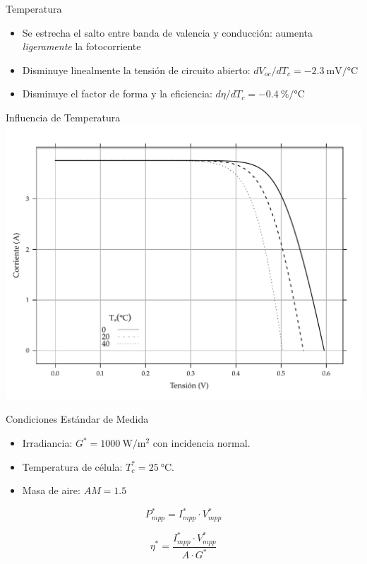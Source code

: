 \documentclass[xcolor={usenames,svgnames,dvipsnames}]{beamer}
\begin{document}
\begin{frame}[label=sec-3-2-3]{Temperatura}
\begin{itemize}
\item Se estrecha el salto entre banda de valencia y conducción: aumenta \emph{ligeramente} la fotocorriente

\item \alert{Disminuye linealmente la tensión de circuito abierto}: $dV_{oc}/dT_{c}=\SI{-2.3}{\milli\volt\per\celsius}$

\item Disminuye el factor de forma y la eficiencia:
$d\eta/dT_{c}=\SI{-0.4}{\percent\per\celsius}$
\end{itemize}
\end{frame}

\begin{frame}[label=sec-3-2-4]{Influencia de Temperatura}
\includegraphics[width=.9\linewidth]{../figs/CurvaIV_G800.pdf}
\end{frame}

\begin{frame}[label=sec-3-2-5]{Condiciones Estándar de Medida}
\begin{itemize}
\item Irradiancia: $G^{*}=\SI{1000}{\watt\per\meter\squared}$ con
incidencia normal.

\item Temperatura de célula: $T_{c}^{*}=\SI{25}{\celsius}$.

\item Masa de aire: $AM=1.5$
\end{itemize}

$$P_{mpp}^{*}=I_{mpp}^{*}\cdot V_{mpp}^{*}$$

$$\eta^{*}=\frac{I_{mpp}^{*}\cdot V_{mpp}^{*}}{A\cdot G^{*}}$$
\end{frame}
\end{document}
